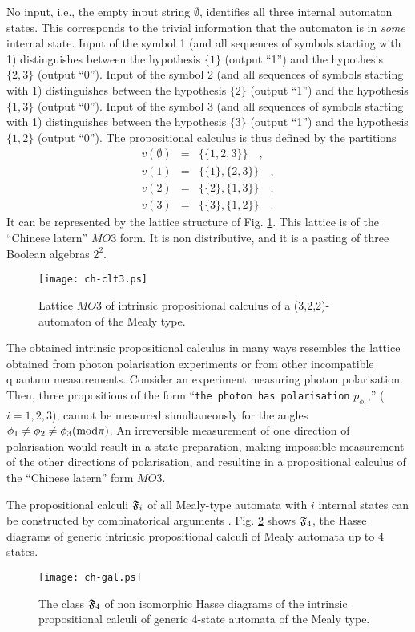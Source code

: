 \documentclass{article}
\begin{document}
No input, i.e., the empty input string $\emptyset$, identifies all three
internal automaton states. This corresponds to the trivial information
that the automaton is in {\em some} internal state.
Input of the symbol 1 (and all sequences of symbols starting with 1)
distinguishes between the hypothesis $\{1\}$ (output ``1'') and the
hypothesis
$\{2,3\}$ (output ``0'').
Input of the symbol 2 (and all sequences of symbols starting with 1)
distinguishes between the hypothesis $\{2\}$ (output ``1'') and the
hypothesis
$\{1,3\}$ (output ``0'').
Input of the symbol 3 (and all sequences of symbols starting with 1)
distinguishes between the hypothesis $\{3\}$ (output ``1'') and the
hypothesis
$\{1,2\}$ (output ``0'').
 The
  propositional calculus  is thus
 defined by the partitions
 \begin{eqnarray}
 v(\emptyset )&=&\{\{1,2,3\}\} \quad ,\\
 v(1 )&=&\{ \{1\} , \{2,3\}  \}\quad ,\\
 v(2 )&=&\{ \{2\} , \{1,3\}  \}\quad ,\\
 v(3 )&=&\{ \{3\} , \{1,2\}  \}\quad .
 \end{eqnarray}
 It can be represented by the lattice structure of Fig.
 \ref{f-mealy-a-i-p-c}.
 This lattice is of the ``Chinese latern'' $MO3$ form.
 It is non distributive, and it is a
pasting of three Boolean algebras $2^2$.
 \begin{figure}
\texttt{[image: ch-clt3.ps]}
 \caption{Lattice $MO3$ of intrinsic propositional calculus
 of  a  (3,2,2)-automaton
 of the Mealy type.
\label{f-mealy-a-i-p-c}}
\end{figure}

 The obtained intrinsic propositional calculus
 in many ways  resembles the lattice obtained from photon polarisation
 experiments
 or from other incompatible quantum measurements.
Consider an experiment measuring photon polarisation.
 Then, three propositions  of the
form
``{\tt the  photon  has polarisation} $p_{\phi_1}$,'' ($i=1,2,3$),
 cannot be measured simultaneously for the angles $\phi_1 \neq
\phi_2\neq \phi_3
 ({\rm mod } \pi )$. An irreversible measurement of one direction of
polarisation would result in a state preparation, making impossible
measurement of the other directions of polarisation, and
resulting in a propositional calculus of the
 ``Chinese latern'' form $MO3$.


The
propositional calculi ${\frak F}_i$ of all Mealy-type automata with
$i$ internal
states can be constructed by combinatorical arguments
\cite{svozil-book}.
 Fig. \ref{f-hdxxx} shows ${\frak F}_4$, the Hasse diagrams of
 generic intrinsic  propositional calculi
 of Mealy automata up to 4 states.
\begin{figure}
\texttt{[image: ch-gal.ps]}
\caption{The class ${\frak F}_4$ of non isomorphic Hasse diagrams
 of the intrinsic propositional calculi of generic 4-state
 automata of the Mealy type.
 \label{f-hdxxx}}
\end{figure}
\end{document}
